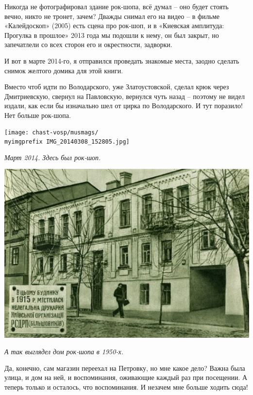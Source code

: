 Никогда не фотографировал здание рок-шопа, всё думал – оно будет стоять вечно, никто не тронет, зачем? Дважды снимал его на видео – в фильме «Калейдоскоп» (2005) есть сцена про рок-шоп, и в «Киевская амплитуда: Прогулка в прошлое» 2013 года мы подошли к нему, он был закрыт, но запечатлели со всех сторон его и окрестности, задворки.

И вот в марте 2014-го, я отправился проведать знакомые места, заодно сделать снимок желтого домика для этой книги. 

Вместо чтоб идти по Володарского, уже Златоустовской, сделал крюк через Дмитриевскую, свернул на Павловскую, вернулся чуть назад – поэтому не видел издали, как если бы изначально шел от цирка по Володарского. И тут поразило! Нет больше рок-шопа.

\begin{center}
\texttt{[image: chast-vosp/musmags/\\myimgprefix IMG\_20140308\_152805.jpg]}

\textit{Март 2014. Здесь был рок-шоп.}
\end{center}

\begin{center}
\includegraphics[width=\linewidth]{chast-vosp/musmags/rock-50.jpg}

\textit{А так выглядел дом рок-шопа в 1950-х.}
\end{center}

\newpage

Да, конечно, сам магазин переехал на Петровку, но мне какое дело? Важна была улица, и дом на ней, и воспоминания, оживающие каждый раз при посещении. А теперь только и осталось, что  воспоминания. И незачем мне больше ходить сюда!

